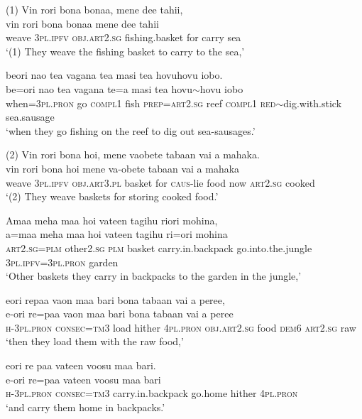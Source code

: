 \ea\label{ex:text01-101}
(1) Vin rori bona bonaa, mene dee tahii,\\
\gll vin	rori	bona	bonaa	mene	dee	tahii\\
     weave	3\textsc{pl}.\textsc{ipfv}	\textsc{obj}.\textsc{art}2.\textsc{sg}	fishing.basket	for	carry	sea\\
\glt `(1) They weave the fishing basket to carry to the sea,'
\z

\ea\label{ex:text01-102}
beori nao tea vagana tea masi tea hovuhovu iobo.\\
\gll be=ori	nao	tea	vagana	te=a	masi	tea	hovu{$\sim$}hovu	iobo\\
     when=3\textsc{pl}.\textsc{pron}	go	\textsc{compl}1	fish	\textsc{prep}=\textsc{art}2.\textsc{sg}	reef	\textsc{compl}1	\textsc{red}{$\sim$}dig.with.stick	sea.sausage\\
\glt `when they go fishing on the reef to dig out sea-sausages.'
\z

\ea\label{ex:text01-103}
(2) Vin rori bona hoi, mene vaobete tabaan vai a mahaka.\\
\gll vin	rori	bona	hoi	mene	va-obete	tabaan	vai	a	mahaka\\
     weave	3\textsc{pl}.\textsc{ipfv}	\textsc{obj}.\textsc{art}3.\textsc{pl}	basket	for	\textsc{caus}-lie	food	now	\textsc{art}2.\textsc{sg}	cooked\\
\glt `(2) They weave baskets for storing cooked food.'
\z

\ea\label{ex:text01-104}
Amaa meha maa hoi vateen tagihu riori mohina,\\
\gll a=maa	meha	maa	hoi	vateen	tagihu	ri=ori	mohina\\
     \textsc{art}2.\textsc{sg}=\textsc{plm}	other2.\textsc{sg}	\textsc{plm}	basket	carry.in.backpack	go.into.the.jungle	3\textsc{pl}.\textsc{ipfv}=3\textsc{pl}.\textsc{pron}	garden\\
\glt `Other baskets they carry in backpacks to the garden in the jungle,'
\z

\ea\label{ex:text01-105}
eori repaa vaon maa bari bona tabaan vai a peree,\\
\gll e-ori	re=paa	vaon	maa	bari	bona	tabaan	vai	a	peree\\
     \textsc{h}-3\textsc{pl}.\textsc{pron}	\textsc{consec}=\textsc{tm}3	load	hither	4\textsc{pl}.\textsc{pron}	\textsc{obj}.\textsc{art}2.\textsc{sg}	food	\textsc{dem}6	\textsc{art}2.\textsc{sg}	raw\\
\glt `then they load them with the raw food,'
\z

\ea\label{ex:text01-106}
eori re paa vateen voosu maa bari.\\
\gll e-ori	re=paa	vateen	voosu	maa	bari\\
     \textsc{h}-3\textsc{pl}.\textsc{pron}	\textsc{consec}=\textsc{tm}3	carry.in.backpack	go.home	hither	4\textsc{pl}.\textsc{pron}\\
\glt `and carry them home in backpacks.'
\z

